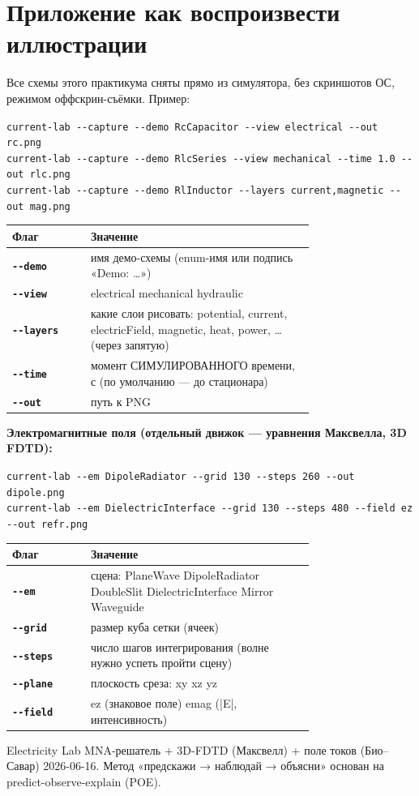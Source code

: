 \documentclass[11pt]{article}
\begin{document}
\section*{Приложение \textperiodcentered{} как воспроизвести иллюстрации}
Все схемы этого практикума сняты прямо из симулятора, без скриншотов ОС, режимом
оффскрин-съёмки. Пример:

\texttt{current-lab -{}-capture -{}-demo RcCapacitor -{}-view electrical -{}-out rc.png}\\
\texttt{current-lab -{}-capture -{}-demo RlcSeries -{}-view mechanical -{}-time 1.0 -{}-out rlc.png}\\
\texttt{current-lab -{}-capture -{}-demo RlInductor -{}-layers current,magnetic -{}-out mag.png}

\medskip
\begin{tabular}{@{}>{\bfseries}l p{0.74\linewidth}@{}}
\toprule
Флаг & Значение \\
\midrule
\texttt{-{}-demo} & имя демо-схемы (enum-имя или подпись «Demo: …») \\
\texttt{-{}-view} & electrical \textperiodcentered{} mechanical \textperiodcentered{} hydraulic \\
\texttt{-{}-layers} & какие слои рисовать: potential, current, electricField, magnetic, heat, power, … (через запятую) \\
\texttt{-{}-time} & момент СИМУЛИРОВАННОГО времени, с (по умолчанию — до стационара) \\
\texttt{-{}-out}  & путь к PNG \\
\bottomrule
\end{tabular}

\medskip
\textbf{Электромагнитные поля (отдельный движок — уравнения Максвелла, 3D FDTD):}

\texttt{current-lab -{}-em DipoleRadiator -{}-grid 130 -{}-steps 260 -{}-out dipole.png}\\
\texttt{current-lab -{}-em DielectricInterface -{}-grid 130 -{}-steps 480 -{}-field ez -{}-out refr.png}

\medskip
\begin{tabular}{@{}>{\bfseries}l p{0.74\linewidth}@{}}
\toprule
Флаг & Значение \\
\midrule
\texttt{-{}-em}    & сцена: PlaneWave \textperiodcentered{} DipoleRadiator \textperiodcentered{} DoubleSlit \textperiodcentered{} DielectricInterface \textperiodcentered{} Mirror \textperiodcentered{} Waveguide \\
\texttt{-{}-grid}  & размер куба сетки (ячеек) \\
\texttt{-{}-steps} & число шагов интегрирования (волне нужно успеть пройти сцену) \\
\texttt{-{}-plane} & плоскость среза: xy \textperiodcentered{} xz \textperiodcentered{} yz \\
\texttt{-{}-field} & ez (знаковое поле) \textperiodcentered{} emag (|E|, интенсивность) \\
\bottomrule
\end{tabular}

\vspace{20pt}
{\color{muted}\small Electricity Lab \textperiodcentered{} MNA-решатель + 3D-FDTD (Максвелл) + поле токов (Био–Савар) \textperiodcentered{} 2026-06-16.
Метод «предскажи → наблюдай → объясни» основан на predict-observe-explain (POE).}
\end{document}
